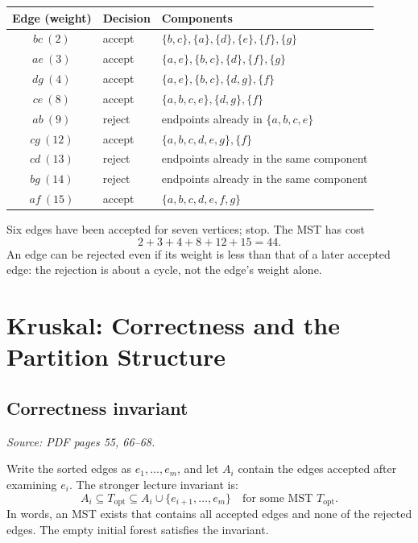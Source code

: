 \documentclass[11pt,letterpaper]{article}
\newcommand{\sourcepages}[1]{\textit{Source: PDF pages #1.}}
\begin{document}
\begin{center}\small
\begin{tabular}{cll}
\toprule
Edge (weight) & Decision & Components \\
\midrule
$bc\ (2)$ & accept & $\{b,c\},\{a\},\{d\},\{e\},\{f\},\{g\}$ \\
$ae\ (3)$ & accept & $\{a,e\},\{b,c\},\{d\},\{f\},\{g\}$ \\
$dg\ (4)$ & accept & $\{a,e\},\{b,c\},\{d,g\},\{f\}$ \\
$ce\ (8)$ & accept & $\{a,b,c,e\},\{d,g\},\{f\}$ \\
$ab\ (9)$ & reject & endpoints already in $\{a,b,c,e\}$ \\
$cg\ (12)$ & accept & $\{a,b,c,d,e,g\},\{f\}$ \\
$cd\ (13)$ & reject & endpoints already in the same component \\
$bg\ (14)$ & reject & endpoints already in the same component \\
$af\ (15)$ & accept & $\{a,b,c,d,e,f,g\}$ \\
\bottomrule
\end{tabular}
\end{center}
Six edges have been accepted for seven vertices; stop. The MST has cost
\[
 2+3+4+8+12+15=\boxed{44}.
\]
An edge can be rejected even if its weight is less than that of a later accepted edge: the rejection is about a cycle, not the edge's weight alone.

\newpage
\section{Kruskal: Correctness and the Partition Structure}
\subsection{Correctness invariant}
\sourcepages{55, 66--68}

Write the sorted edges as $e_1,\ldots,e_m$, and let $A_i$ contain the edges accepted after examining $e_i$. The stronger lecture invariant is:
\[
 A_i\subseteq T_{\mathrm{opt}}
 \subseteq A_i\cup\{e_{i+1},\ldots,e_m\}
 \quad\text{for some MST }T_{\mathrm{opt}}.
\]
In words, an MST exists that contains all accepted edges and none of the rejected edges. The empty initial forest satisfies the invariant.
\end{document}
